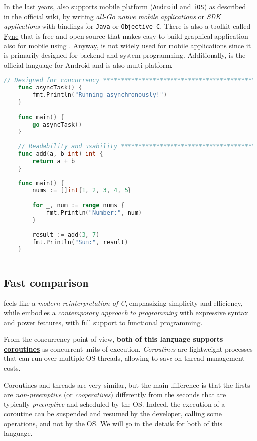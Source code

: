 In the last years, \Go also supports mobile platform (\texttt{Android} and \texttt{iOS}) as described in the official \href{https://go.dev/wiki/Mobile}{wiki}, by writing \textit{all-Go native mobile applications} or \textit{SDK applications} with bindings for \texttt{Java} or \texttt{Objective-C}.
There is also a toolkit called \href{https://fyne.io/}{Fyne} that is free and open source that makes easy to build graphical application also for mobile using \Go.
Anyway,  \Go is not widely used for mobile applications since it is primarily designed for backend and system programming. Additionally, \Kotlin is the official language for Android and is also multi-platform.\\

\begin{lstlisting}[language=go,caption={Exemples of  \Go 's features}]
	// Designed for concurrency *******************************************
	func asyncTask() {
		fmt.Println("Running asynchronously!")
	}
	
	func main() {
		go asyncTask()
	}
	
	// Readability and usability ******************************************
	func add(a, b int) int {
		return a + b
	}
	
	func main() {
		nums := []int{1, 2, 3, 4, 5}
		
		for _, num := range nums {
			fmt.Println("Number:", num)
		}
		
		result := add(3, 7)
		fmt.Println("Sum:", result)
	}
	
\end{lstlisting}

\subsection{Fast comparison}

\Go feels like a \emph{modern reinterpretation of C}, emphasizing simplicity and efficiency, while \Kotlin embodies a \emph{contemporary approach to programming} with expressive syntax and power features, with full support to functional programming.

From the concurrency point of view, \textbf{both of this language supports \href{https://en.wikipedia.org/wiki/Coroutine}{coroutines}} as concurrent units of execution. \textit{Coroutines} are lightweight processes that can run over multiple OS threads, allowing to save on thread management costs.

Coroutines and threads are very similar, but the main difference is that the firsts are \textit{non-preemptive} (or \textit{cooperatives}) differently from the seconds that are typically \textit{preemptive} and scheduled by the OS. Indeed, the execution of a coroutine can be suspended and resumed by the developer, calling some operations, and not by the OS. We will go in the details for both of this language.

